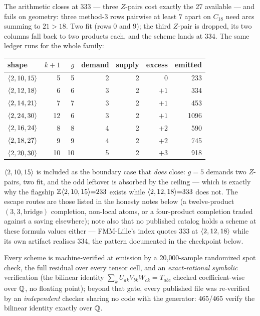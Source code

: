 The arithmetic closes at 333 --- three \(Z\)-pairs cost exactly the 27
available --- and fails on geometry: three method-3 rows pairwise at least
\(7\) apart on \(C_{18}\) need arcs summing to \(21 > 18\). Two fit (rows
\(0\) and \(9\)); the third \(Z\)-pair is dropped, its two columns fall back
to two products each, and the scheme lands at 334. The same ledger runs for
the whole family:

\begin{center}
\begin{tabular}{lrrrrrr}
\hline
shape & \(k{+}1\) & \(g\) & demand & supply & excess & emitted \\
\hline
\(\langle 2, 10, 15 \rangle\) & 5 & 5 & 2 & 2 & 0 & 233 \\
\(\langle 2, 12, 18 \rangle\) & 6 & 6 & 3 & 2 & \(+1\) & 334 \\
\(\langle 2, 14, 21 \rangle\) & 7 & 7 & 3 & 2 & \(+1\) & 453 \\
\(\langle 2, 24, 30 \rangle\) & 12 & 6 & 3 & 2 & \(+1\) & 1096 \\
\(\langle 2, 16, 24 \rangle\) & 8 & 8 & 4 & 2 & \(+2\) & 590 \\
\(\langle 2, 18, 27 \rangle\) & 9 & 9 & 4 & 2 & \(+2\) & 745 \\
\(\langle 2, 20, 30 \rangle\) & 10 & 10 & 5 & 2 & \(+3\) & 918 \\
\hline
\end{tabular}
\end{center}

\(\langle 2, 10, 15 \rangle\) is included as the boundary case that \emph{does}
close: \(g = 5\) demands two \(Z\)-pairs, two fit, and the odd leftover is
absorbed by the ceiling --- which is exactly why the flagship
\(\mathbb{Z}\langle 2, 10, 15 \rangle{=}233\) exists while
\(\langle 2, 12, 18 \rangle{=}333\) does not. The escape routes are those listed
in the honesty notes below (a twelve-product \((3,3,\mathrm{bridge})\)
completion, non-local atoms, or a four-product completion traded against a
saving elsewhere); note also that no published catalog holds a scheme at
these formula values either --- FMM-Lille's index quotes 333 at
\(\langle 2, 12, 18 \rangle\) while its own artifact realises 334, the pattern
documented in the checkpoint below.

Every scheme is machine-verified at emission by a 20{,}000-sample
randomized spot check, the full residual over every tensor cell, and an
\emph{exact-rational symbolic} verification (the bilinear identity
\(\sum_k U_{a k} V_{b k} W_{c k} = T_{abc}\) checked coefficient-wise over
\(\mathbb{Q}\), no floating point); beyond that gate, every published file
was re-verified by an \emph{independent} checker sharing no code with the
generator: 465/465 verify the bilinear identity exactly over \(\mathbb{Q}\).

